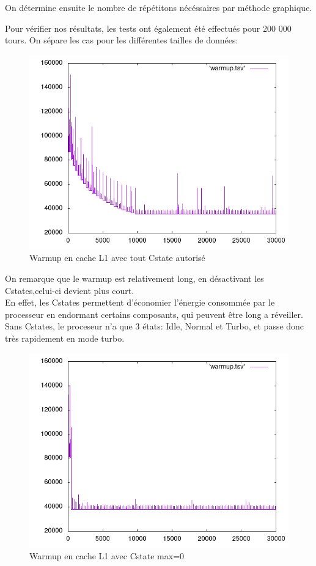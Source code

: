 \documentclass{report}
\begin{document}
On détermine ensuite le nombre de répétitons nécéssaires par méthode graphique.

Pour vérifier nos résultats, les tests ont également été effectués pour 200 000 tours.
On sépare les cas pour les différentes tailles de données:
\newpage
    \begin{figure}[ht!]
        \centering
        \includegraphics[width=120mm]{MEDIA/warmupL1_Cstate.png}
        \caption{Warmup en cache L1 avec tout Cstate autorisé}
    \end{figure}

On remarque que le warmup est relativement long, en désactivant les Cstates,celui-ci devient plus court.\\

En effet, les Cstates permettent d'économier l'énergie consommée par le processeur en endormant certains composants, qui peuvent être long a réveiller.\\

Sans Cstates, le proceseur n'a que 3 états: Idle, Normal et Turbo, et passe donc très rapidement en mode turbo.\\
\newpage
    \begin{figure}[ht!]
        \centering
        \includegraphics[width=120mm]{MEDIA/warmupL1_NOCstate.png}
        \caption{Warmup en cache L1 avec Cstate max=0}
    \end{figure}
\end{document}
